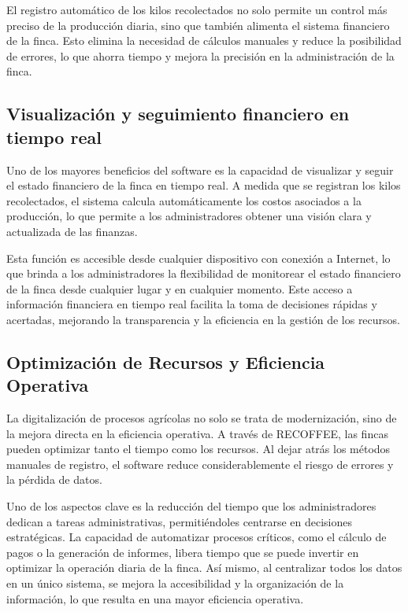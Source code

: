 \documentclass[12pt]{article}
\begin{document}
El registro autom\'atico de los kilos recolectados no solo permite un control m\'as preciso de la producci\'on diaria, sino que tambi\'en alimenta el sistema financiero de la finca. Esto elimina la necesidad de c\'alculos manuales y reduce la posibilidad de errores, lo que ahorra tiempo y mejora la precisi\'on en la administraci\'on de la finca.

\subsection{Visualizaci\'on y seguimiento financiero en tiempo real}

Uno de los mayores beneficios del software es la capacidad de visualizar y seguir el estado financiero de la finca en tiempo real. A medida que se registran los kilos recolectados, el sistema calcula autom\'aticamente los costos asociados a la producci\'on, lo que permite a los administradores obtener una visi\'on clara y actualizada de las finanzas.

Esta funci\'on es accesible desde cualquier dispositivo con conexi\'on a Internet, lo que brinda a los administradores la flexibilidad de monitorear el estado financiero de la finca desde cualquier lugar y en cualquier momento. Este acceso a informaci\'on financiera en tiempo real facilita la toma de decisiones r\'apidas y acertadas, mejorando la transparencia y la eficiencia en la gesti\'on de los recursos.

\subsection{Optimizaci\'on de Recursos y Eficiencia Operativa}

La digitalizaci\'on de procesos agr\'icolas no solo se trata de modernizaci\'on, sino de la mejora directa en la eficiencia operativa. A trav\'es de RECOFFEE, las fincas pueden optimizar tanto el tiempo como los recursos. Al dejar atr\'as los m\'etodos manuales de registro, el software reduce considerablemente el riesgo de errores y la p\'erdida de datos.

Uno de los aspectos clave es la reducci\'on del tiempo que los administradores dedican a tareas administrativas, permiti\'endoles centrarse en decisiones estrat\'egicas. La capacidad de automatizar procesos cr\'iticos, como el c\'alculo de pagos o la generaci\'on de informes, libera tiempo que se puede invertir en optimizar la operaci\'on diaria de la finca. As\'i mismo, al centralizar todos los datos en un \'unico sistema, se mejora la accesibilidad y la organizaci\'on de la informaci\'on, lo que resulta en una mayor eficiencia operativa.
\end{document}
